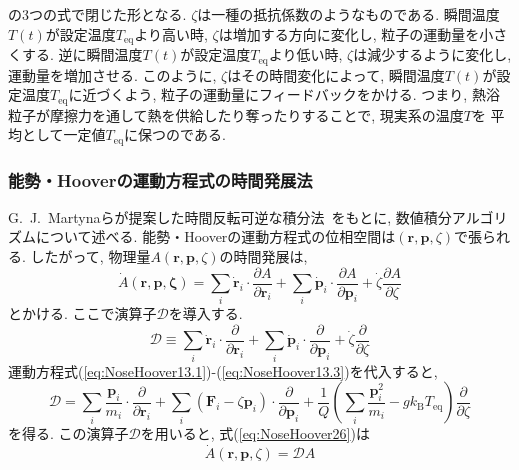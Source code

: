 の3つの式で閉じた形となる.
$\zeta$は一種の抵抗係数のようなものである.
瞬間温度$T(t)$が設定温度$T_{\mathrm{eq}}$より高い時, $\zeta$は増加する方向に変化し, 粒子の運動量を小さくする.
逆に瞬間温度$T(t)$が設定温度$T_{\mathrm{eq}}$より低い時, $\zeta$は減少するように変化し, 運動量を増加させる.
このように, $\zeta$はその時間変化によって, 瞬間温度$T(t)$が設定温度$T_{\mathrm{eq}}$に近づくよう, 粒子の運動量にフィードバックをかける.
つまり, 熱浴粒子が摩擦力を通して熱を供給したり奪ったりすることで, 現実系の温度$T$を
平均として一定値$T_{\mathrm{eq}}$に保つのである.


\subsubsection{能勢・Hooverの運動方程式の時間発展法}
G.~J.~Martynaらが提案した時間反転可逆な積分法~\cite{1992Tuckerman, 1996Martyna}をもとに,
数値積分アルゴリズムについて述べる.
能勢・Hooverの運動方程式の位相空間は$(\bm{r}, \bm{p}, \zeta)$で張られる.
したがって, 物理量$A(\bm{r}, \bm{p}, \zeta)$の時間発展は,
\begin{equation}
 \dot{A}(\bm{r}, \bm{p}, \bm{\zeta})
  =
  \sum_{i} \dot{\bm{r}}_{i} \cdot \frac{\partial A}{\partial \bm{r}_{i}}
  +
  \sum_{i} \dot{\bm{p}}_{i} \cdot \frac{\partial A}{\partial \bm{p}_{i}}
  +
  \dot{\zeta} \frac{\partial A}{\partial \zeta}
 \label{eq:NoseHoover26}
\end{equation}
とかける. ここで演算子$\mathcal{D}$を導入する.
\begin{equation}
 \mathcal{D}
  \equiv
  \sum_{i} \dot{\bm{r}}_{i} \cdot \frac{\partial}{\partial \bm{r}_{i}}
  +
  \sum_{i} \dot{\bm{p}}_{i} \cdot \frac{\partial}{\partial \bm{p}_{i}}
  +
  \dot{\zeta} \frac{\partial}{\partial \zeta}
 \label{eq:NoseHoover27}
\end{equation}
運動方程式(\ref{eq:NoseHoover13.1})-(\ref{eq:NoseHoover13.3})を代入すると,
\begin{equation}
 \mathcal{D}
  =
  \sum_{i} \frac{\bm{p}_{i}}{m_{i}} \cdot \frac{\partial}{\partial \bm{r}_{i}}
  +
  \sum_{i} (\bm{F}_{i} - \zeta \bm{p}_{i}) \cdot \frac{\partial}{\partial \bm{p}_{i}}
  +
  \frac{1}{Q}
  \left( \sum_{i} \frac{\bm{p}^{2}_{i}}{m_{i}} - g k_{\mathrm{B}} T_{\mathrm{eq}} \right)
  \frac{\partial}{\partial \zeta}
 \label{eq:NoseHoover28}
\end{equation}
を得る. この演算子$\mathcal{D}$を用いると, 式(\ref{eq:NoseHoover26})は
\begin{equation}
 \dot{A} \left( \bm{r}, \bm{p}, \zeta \right)
  =
  \mathcal{D} A
  \label{eq:NoseHoover29}
\end{equation}
